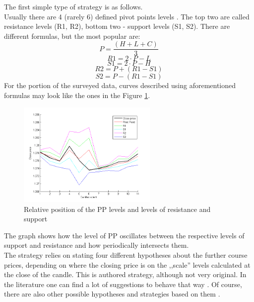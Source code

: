 \documentclass{jtacs}
\begin{document}
The first simple type of strategy is as follows. \\
Usually there are 4 (rarely 6) defined pivot points levels \cite{person} \cite{myers}. The top two are called resistance levels (R1, R2), bottom two - support levels (S1, S2). There are different formulas, but the most popular \cite{person} are:
\begin{equation}
P= \frac{(H+L+C)}{3}
\end{equation}
\begin{equation}
R1=2 \cdot P-L
\end{equation}
\begin{equation}
S1=2 \cdot P-H
\end{equation}
\begin{equation}
R2=P+(R1-S1)
\end{equation}
\begin{equation}
S2=P-(R1-S1)
\end{equation}
For the portion of the surveyed data, curves described using aforementioned formulas may look like the ones in the Figure \ref{rys2}.
\begin{figure}[ht]
\centering
\includegraphics[width = 0.6\textwidth]{pictures/samplePP2.png}
\caption{Relative position of the PP levels and levels of resistance and support}
\label{rys2}
\end{figure}
\FloatBarrier
The graph shows how the level of PP oscillates between the respective levels of support and resistance and how periodically intersects them.\\

The strategy relies on stating four different hypotheses about the further course prices, depending on where the closing price is on the ,,scale'' levels calculated at the close of the candle. This is authored strategy, although not very original. In the literature one can find a lot of suggestions to behave that way \cite{murphy}\cite{krutsinger}\cite{elder}. Of course, there are also other possible hypotheses and strategies based on them \cite{wilinskir}.\\
\end{document}
